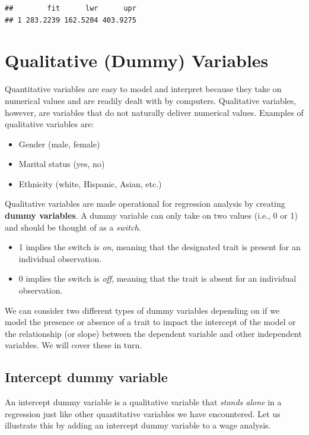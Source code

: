 \documentclass[
]{book}
\begin{document}
\begin{verbatim}
##        fit      lwr      upr
## 1 283.2239 162.5204 403.9275
\end{verbatim}

\hypertarget{qualitative-dummy-variables}{%
\section{Qualitative (Dummy) Variables}\label{qualitative-dummy-variables}}

Quantitative variables are easy to model and interpret because they take on numerical values and are readily dealt with by computers. Qualitative variables, however, are variables that do not naturally deliver numerical values. Examples of qualitative variables are:

\begin{itemize}
\item
  Gender (male, female)
\item
  Marital status (yes, no)
\item
  Ethnicity (white, Hispanic, Asian, etc.)
\end{itemize}

Qualitative variables are made operational for regression analysis by creating \textbf{dummy variables}. A dummy variable can only take on two values (i.e., 0 or 1) and should be thought of as a \emph{switch}.

\begin{itemize}
\item
  1 implies the switch is \emph{on}, meaning that the designated trait is present for an individual observation.
\item
  0 implies the switch is \emph{off}, meaning that the trait is absent for an individual observation.
\end{itemize}

We can consider two different types of dummy variables depending on if we model the presence or absence of a trait to impact the intercept of the model or the relationship (or slope) between the dependent variable and other independent variables. We will cover these in turn.

\hypertarget{intercept-dummy-variable}{%
\subsection{Intercept dummy variable}\label{intercept-dummy-variable}}

An intercept dummy variable is a qualitative variable that \emph{stands alone} in a regression just like other quantitative variables we have encountered. Let us illustrate this by adding an intercept dummy variable to a wage analysis.
\end{document}

